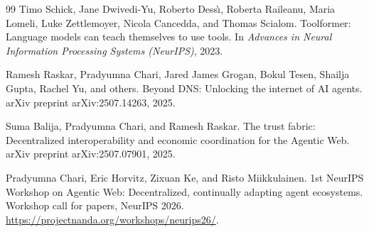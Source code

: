 \documentclass{article}
\begin{document}
\begin{thebibliography}{99}
Timo Schick, Jane Dwivedi{-}Yu, Roberto Dess{\`\i}, Roberta Raileanu, Maria Lomeli, Luke Zettlemoyer, Nicola Cancedda, and Thomas Scialom.
\newblock Toolformer: Language models can teach themselves to use tools.
\newblock In \emph{Advances in Neural Information Processing Systems (NeurIPS)}, 2023.

Ramesh Raskar, Pradyumna Chari, Jared James Grogan, Bokul Tesen, Shailja Gupta, Rachel Yu, and others.
\newblock Beyond DNS: Unlocking the internet of AI agents.
\newblock arXiv preprint arXiv:2507.14263, 2025.

Suma Balija, Pradyumna Chari, and Ramesh Raskar.
\newblock The trust fabric: Decentralized interoperability and economic coordination for the Agentic Web.
\newblock arXiv preprint arXiv:2507.07901, 2025.

Pradyumna Chari, Eric Horvitz, Zixuan Ke, and Risto Miikkulainen.
\newblock 1st NeurIPS Workshop on Agentic Web: Decentralized, continually adapting agent ecosystems.
\newblock Workshop call for papers, NeurIPS 2026.
\newblock \url{https://projectnanda.org/workshops/neurips26/}.

\end{thebibliography}
\end{document}
